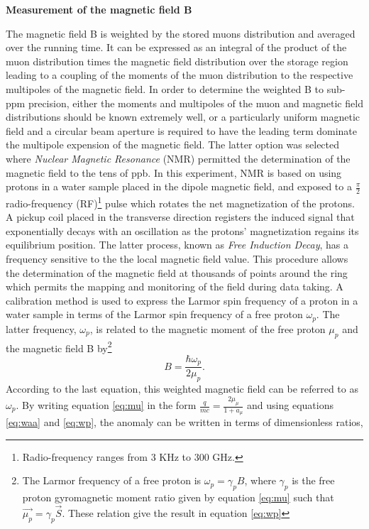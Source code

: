 \documentclass{outhesis}
\begin{document}
\textbf{Measurement of the magnetic field B}

The magnetic field B is weighted by the stored muons distribution and averaged over the running time. It can be expressed as an integral of the product of the muon distribution times the magnetic field distribution over the storage region leading to a coupling of the moments of the muon distribution to the respective multipoles of the magnetic field. In order to determine the weighted B to sub-ppm precision, either the moments and multipoles of the muon and magnetic field distributions should be known extremely well, or a particularly uniform magnetic field and a circular beam aperture is required to have the leading term dominate the multipole expension of the magnetic field. The latter option was selected where \emph{Nuclear Magnetic Resonance} (NMR) permitted the determination of the magnetic field to the tens of ppb. In this experiment, NMR is based on using protons in a water sample placed in the dipole magnetic field, and exposed to a $\frac{\pi}{2}$ radio-frequency (RF)\footnote{Radio-frequency ranges from 3 KHz to 300 GHz.} pulse which rotates the net magnetization of the protons. A pickup coil placed in the transverse direction registers the induced signal that exponentially decays with an oscillation as the protons' magnetization regains its equilibrium position. The latter process, known as \emph{Free Induction Decay}, has a frequency sensitive to the the local magnetic field value. This procedure allows the determination of the magnetic field at thousands of points around the ring which permits the mapping and monitoring of the field during data taking. A calibration method is used to express the Larmor spin frequency of a proton in a water sample in terms of the Larmor spin frequency of a free proton $\omega_p$. The latter frequency, $\omega_p$, is related to the magnetic moment of the free proton $\mu_p$ and the magnetic field B by\footnote{The Larmor frequency of a free proton is $\omega_p=\gamma_pB$, where $\gamma_p$ is the free proton gyromagnetic moment ratio given by equation \ref{eq:mu} such that $\overrightarrow{\mu_p} = \gamma_p \overrightarrow{S}$. These relation give the result in equation \ref{eq:wp}}
\begin{equation}
B = \frac{\hbar\omega_p}{2\mu_p}.
\label{eq:wp}
\end{equation} 
According to the last equation, this weighted magnetic field can be referred to as $\omega_p$. 
By writing equation \ref{eq:mu} in the form $\displaystyle \frac{q}{mc} = \frac{2\mu_{\mu}}{1+a_{\mu}}$ and using equations \ref{eq:waa} and \ref{eq:wp}, the anomaly can be written in terms of dimensionless ratios,
\end{document}
